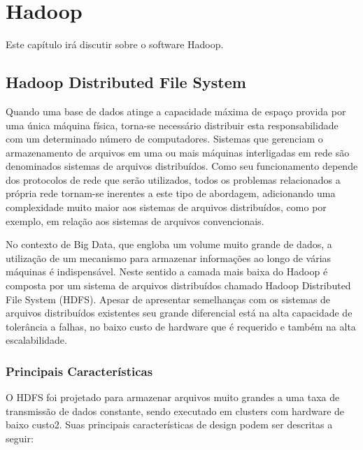 \chapter{Hadoop}
\label{cap:hadoop}

Este capítulo irá discutir sobre o software Hadoop.

\section{Hadoop Distributed File System}

Quando uma base de dados atinge a capacidade máxima de espaço provida por uma única máquina física, torna-se necessário distribuir esta responsabilidade com um determinado número de computadores. Sistemas que gerenciam o armazenamento de arquivos em uma ou mais máquinas interligadas em rede são denominados sistemas de arquivos distribuídos. Como seu funcionamento depende dos protocolos de rede que serão utilizados, todos os problemas relacionados a própria rede tornam-se inerentes a este tipo de abordagem, adicionando uma complexidade muito maior aos sistemas de arquivos distribuídos, como por exemplo, em relação aos sistemas de arquivos convencionais.

No contexto de Big Data, que engloba um volume muito grande de dados, a utilização de um mecanismo para armazenar informações ao longo de várias máquinas é indispensável. Neste sentido a camada mais baixa do Hadoop é composta por um sistema de arquivos distribuídos chamado Hadoop Distributed File System (HDFS). Apesar de apresentar semelhanças com os sistemas de arquivos distribuídos existentes seu grande diferencial está na alta capacidade de tolerância a falhas, no baixo custo de hardware que é requerido e também na alta escalabilidade.

\subsection{Principais Características}

O HDFS foi projetado para armazenar arquivos muito grandes a uma taxa de transmissão de dados constante, sendo executado em clusters com hardware de baixo custo2. Suas principais características de design podem ser descritas a seguir:

